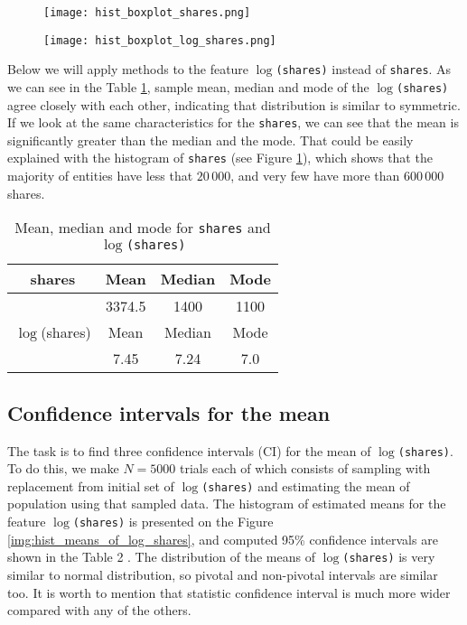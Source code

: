  
\begin{figure}[h!]
 \begin{center}
    \center \texttt{[image: hist\_boxplot\_shares.png]}
   \caption{}
   \label{img:hist_boxplot_shares}
 \end{center}
\end{figure} 
\begin{figure}[h!]
 \begin{center}
    \center \texttt{[image: hist\_boxplot\_log\_shares.png]}
   \caption{}
   \label{img:hist_boxplot_log_shares}
 \end{center}
\end{figure}  

Below we will apply methods to the feature \texttt{$\log$(shares)} instead of \texttt{shares}. As we can see in the Table \ref{tbl:log_shares_stats1}, sample mean, median and mode of the \texttt{$\log$(shares)} agree closely with each other, indicating that distribution is similar to symmetric. If we look at the same characteristics for the \texttt{shares}, we can see that the mean is significantly greater than the median and the mode. That could be easily explained with the histogram of  \texttt{shares} (see Figure \ref{img:hist_boxplot_shares}), which shows that the majority of entities have less that $20\,000$, and very few have more than $600\,000$ shares.    


\begin{table}
\caption{Mean, median and mode for \texttt{shares} and \texttt{$\log$(shares)}} \label{tbl:log_shares_stats1}
\begin{center}
\begin{tabular}{|c|c|c|c|} 
 \hline
shares & Mean & Median & Mode \\ \hline
 & 3374.5 & 1400 & 1100 \\ \hline
$\log$(shares) & Mean & Median & Mode \\ \hline
 &  7.45 & 7.24 & 7.0 \\ \hline
\end{tabular}
\end{center}
\end{table}

\subsection*{Confidence intervals for the mean}
The task is to find three confidence intervals (CI) for the mean of \texttt{$\log$(shares)}. To do this, we make $N = 5000$ trials each of which consists of  sampling with replacement from initial set of \texttt{$\log$(shares)} and estimating the mean of population using that sampled data. The histogram of estimated means for the feature \texttt{$\log$(shares)} is presented on the Figure \ref{img:hist_means_of_log_shares}, and computed 95\% confidence intervals are shown in the Table 2 . The distribution of the means of \texttt{$\log$(shares)} is very similar to normal distribution, so pivotal and non-pivotal intervals are similar too. It is worth to mention that statistic confidence interval is much more wider compared with any of the others. 

